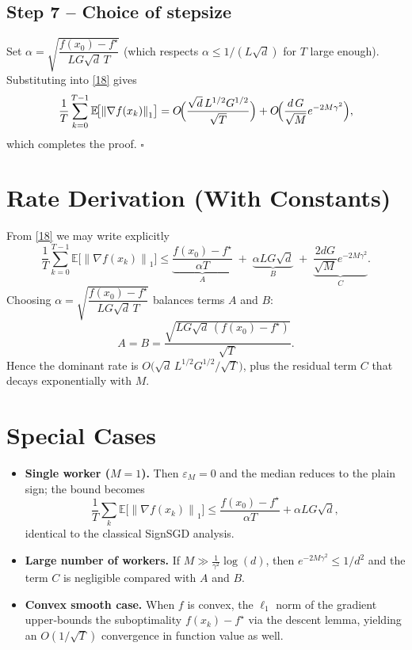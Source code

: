 \documentclass{article}
\newcommand{\E}{\mathbb{E}}
\newcommand{\norm}[1]{\left\lVert#1\right\rVert}
\begin{document}
\subsection*{Step 7 – Choice of stepsize}
Set $\alpha = \sqrt{\dfrac{f(x_{0})-f^{\star}}{L G\sqrt{d}\,T}}$ (which respects
$\alpha\le 1/(L\sqrt{d})$ for $T$ large enough).  Substituting into \eqref{18}
gives
\[
\frac{1}{T}\sum_{k=0}^{T-1}
   \E\!\bigl[\norm{\nabla f(x_{k})}_{1}\bigr]
= O\!\Bigl(\frac{\sqrt{d}\,L^{1/2}G^{1/2}}{\sqrt{T}}\Bigr)
   +O\!\Bigl(\frac{d\,G}{\sqrt{M}}e^{-2M\gamma^{2}}\Bigr),
\]
which completes the proof. \hfill $\square$

\section*{Rate Derivation (With Constants)}
From \eqref{18} we may write explicitly
\[
\frac{1}{T}\sum_{k=0}^{T-1}
   \E\!\bigl[\norm{\nabla f(x_{k})}_{1}\bigr]
\le
\underbrace{\frac{f(x_{0})-f^{\star}}{\alpha T}}_{A}
\;+\;
\underbrace{\alpha L G\sqrt{d}}_{B}
\;+\;
\underbrace{\frac{2dG}{\sqrt{M}}e^{-2M\gamma^{2}}}_{C}.
\]
Choosing $\alpha = \sqrt{\dfrac{f(x_{0})-f^{\star}}{L G\sqrt{d}\,T}}$ balances
terms $A$ and $B$:
\[
A = B = \frac{\sqrt{L G\sqrt{d}\,(f(x_{0})-f^{\star})}}{\sqrt{T}}.
\]
Hence the dominant rate is $O\bigl(\sqrt{d}\,L^{1/2}G^{1/2} / \sqrt{T}\bigr)$,
plus the residual term $C$ that decays exponentially with $M$.

\section*{Special Cases}
\begin{itemize}
\item \textbf{Single worker ($M=1$).}  Then $\varepsilon_{M}=0$ and the median
reduces to the plain sign; the bound becomes
\[
\frac{1}{T}\sum_{k}\E\!\bigl[\norm{\nabla f(x_{k})}_{1}\bigr]
\le
\frac{f(x_{0})-f^{\star}}{\alpha T}
+\alpha L G\sqrt{d},
\]
identical to the classical SignSGD analysis.
\item \textbf{Large number of workers.}  If $M\gg \frac{1}{\gamma^{2}}\log(d)$,
then $e^{-2M\gamma^{2}}\le 1/d^{2}$ and the term $C$ is negligible compared
with $A$ and $B$.
\item \textbf{Convex smooth case.}  When $f$ is convex, the $\ell_{1}$ norm of the gradient
upper‑bounds the suboptimality $f(x_{k})-f^{\star}$ via the descent lemma,
yielding an $O(1/\sqrt{T})$ convergence in function value as well.
\end{itemize}
\end{document}
